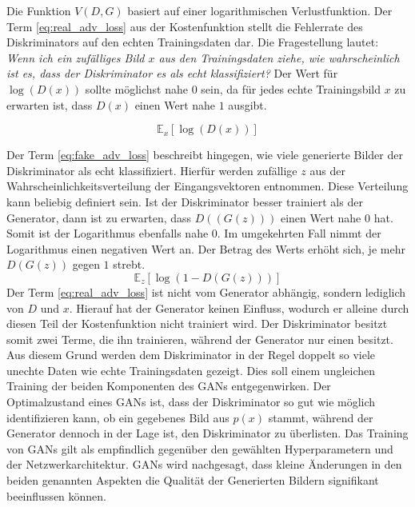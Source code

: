Die Funktion $V(D,G)$ basiert auf einer logarithmischen Verlustfunktion. Der Term \ref{eq:real_adv_loss} aus der Kostenfunktion stellt die Fehlerrate des Diskriminators auf den echten Trainingsdaten dar. Die Fragestellung lautet: \emph{Wenn ich ein zufälliges Bild $x$ aus den Trainingsdaten ziehe, wie wahrscheinlich ist es, dass der Diskriminator es als echt klassifiziert?} Der Wert für $\log(D(x))$ sollte möglichst nahe $0$ sein, da für jedes echte Trainingsbild $x$ zu erwarten ist, dass $D(x)$ einen Wert nahe $1$ ausgibt.

\begin{equation}
	\label{eq:real_adv_loss}
	\mathbb{E}_{x}[\log(D(x))]
\end{equation}

Der Term \ref{eq:fake_adv_loss} beschreibt hingegen, wie viele generierte Bilder der Diskriminator als echt klassifiziert. Hierfür werden zufällige $z$ aus der Wahrscheinlichkeitsverteilung der Eingangsvektoren entnommen. Diese Verteilung kann beliebig definiert sein. Ist der Diskriminator besser trainiert als der Generator, dann ist zu erwarten, dass $D((G(z)))$ einen Wert nahe $0$ hat. Somit ist der Logarithmus ebenfalls nahe $0$. Im umgekehrten Fall nimmt der Logarithmus einen negativen Wert an. Der Betrag des Werts erhöht sich, je mehr $D(G(z))$ gegen $1$ strebt.
\begin{equation}
   \label{eq:fake_adv_loss}
	\mathbb{E}_{z}[\log(1-D(G(z)))]
\end{equation}
Der Term \ref{eq:real_adv_loss} ist nicht vom Generator abhängig, sondern lediglich von $D$ und $x$. Hierauf hat der Generator keinen Einfluss, wodurch er alleine durch diesen Teil der Kostenfunktion nicht trainiert wird. Der Diskriminator besitzt somit zwei Terme, die ihn trainieren, während der Generator nur einen besitzt. Aus diesem Grund werden dem Diskriminator in der Regel doppelt so viele unechte Daten wie echte Trainingsdaten gezeigt. Dies soll einem ungleichen Training der beiden Komponenten des \acp{GAN} entgegenwirken. Der Optimalzustand eines \acp{GAN} ist, dass der Diskriminator so gut wie möglich identifizieren kann, ob ein gegebenes Bild aus $p(x)$ stammt, während der Generator dennoch in der Lage ist, den Diskriminator zu überlisten. Das Training von \acp{GAN} gilt als empfindlich gegenüber den gewählten Hyperparametern und der Netzwerkarchitektur. \acp{GAN} wird nachgesagt, dass kleine Änderungen in den beiden genannten Aspekten die Qualität der Generierten Bildern signifikant beeinflussen können. \cite{visualApproach}

